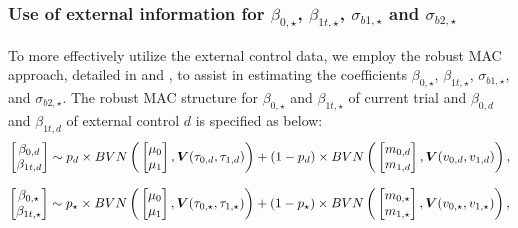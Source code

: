 \subsubsection{\texorpdfstring{Use of external information for $\beta_{0, \star}$, $\beta_{1t,\star}$, $\sigma_{b1,\star}$ and $\sigma_{b2,\star}$}{Use of external information for certain parameters}} \label{sec:external}
To more effectively utilize the external control data, we employ the robust \ac{MAC} approach, detailed in \cite{neuenschwander2016use} and \cite{wang2023dynamic}, to assist in estimating the coefficients $\beta_{0, \star}$, $\beta_{1t, \star}$, $\sigma_{b1, \star}$, and $\sigma_{b2, \star}$. The robust \ac{MAC} structure for $\beta_{0,\star}$ and $\beta_{1t, \star}$ of current trial and $\beta_{0,d}$ and $\beta_{1t,d}$ of external control $d$ is specified as below:
\begin{equation}\label{eq:BLPM}
\begin{bmatrix} \beta_{0,d} \\ \beta_{1t,d} \end{bmatrix} \sim p_d \times BVN\left(\\ \begin{bmatrix} \mu_{0} \\ \mu_{1}\end{bmatrix}, \boldsymbol{V}(\tau_{0,d}, \tau_{1,d})\right) 
+ (1 - p_d) \times BVN\left(\\ \begin{bmatrix} m_{0,d} \\ m_{1,d}\end{bmatrix}, \boldsymbol{V}(v_{0,d}, v_{1,d})\right),
\end{equation}   

\begin{equation}\label{eq:mac}
\begin{bmatrix} \beta_{0,\star} \\ \beta_{1t,\star} \end{bmatrix} \sim p_\star \times BVN\left(\\ \begin{bmatrix} \mu_{0} \\ \mu_{1}\end{bmatrix}, \boldsymbol{V}(\tau_{0,\star}, \tau_{1,\star})\right) 
+ (1 - p_\star) \times BVN\left(\\ \begin{bmatrix} m_{0,\star} \\ m_{1,\star}\end{bmatrix}, \boldsymbol{V}(v_{0,\star}, v_{1,\star})\right),
\end{equation}   

